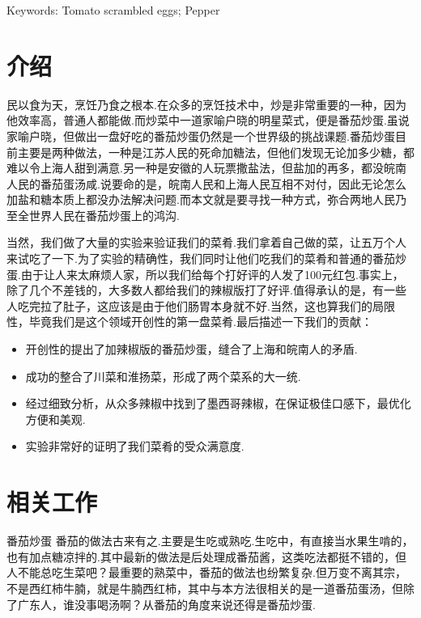 \vspace{1em}\noindent
{}\hei Keywords:
\songti \rm Tomato scrambled eggs; Pepper

\clearpage



\section{介绍}
民以食为天，烹饪乃食之根本.在众多的烹饪技术中，炒是非常重要的一种，因为他效率高，普通人都能做.而炒菜中一道家喻户晓的明星菜式，便是番茄炒蛋.虽说家喻户晓，但做出一盘好吃的番茄炒蛋仍然是一个世界级的挑战课题.番茄炒蛋目前主要是两种做法，一种是江苏人民的死命加糖法，但他们发现无论加多少糖，都难以令上海人甜到满意.另一种是安徽的人玩票撒盐法，但盐加的再多，都没皖南人民的番茄蛋汤咸.说要命的是，皖南人民和上海人民互相不对付，因此无论怎么加盐和糖本质上都没办法解决问题.而本文就是要寻找一种方式，弥合两地人民乃至全世界人民在番茄炒蛋上的鸿沟.

当然，我们做了大量的实验来验证我们的菜肴.我们拿着自己做的菜，让五万个人来试吃了一下.为了实验的精确性，我们同时让他们吃我们的菜肴和普通的番茄炒蛋.由于让人来太麻烦人家，所以我们给每个打好评的人发了100元红包.事实上，除了几个不差钱的，大多数人都给我们的辣椒版打了好评.值得承认的是，有一些人吃完拉了肚子，这应该是由于他们肠胃本身就不好.当然，这也算我们的局限性，毕竟我们是这个领域开创性的第一盘菜肴.最后描述一下我们的贡献：
\begin{itemize}[leftmargin=*,noitemsep]
    \item 开创性的提出了加辣椒版的番茄炒蛋，缝合了上海和皖南人的矛盾.
    \item 成功的整合了川菜和淮扬菜，形成了两个菜系的大一统.
    \item 经过细致分析，从众多辣椒中找到了墨西哥辣椒，在保证极佳口感下，最优化方便和美观.
    \item 实验非常好的证明了我们菜肴的受众满意度.
\end{itemize}




\clearpage
\section{相关工作}
番茄炒蛋 番茄的做法古来有之.主要是生吃或熟吃.生吃中，有直接当水果生啃的\cite{example2022}，也有加点糖凉拌的\cite{example2022}.其中最新的做法是后处理成番茄酱\cite{example2022}，这类吃法都挺不错的，但人不能总吃生菜吧？最重要的熟菜中，番茄的做法也纷繁复杂.但万变不离其宗，不是西红柿牛腩，就是牛腩西红柿，其中与本方法很相关的是一道番茄蛋汤，但除了广东人，谁没事喝汤啊？从番茄的角度来说还得是番茄炒蛋.

